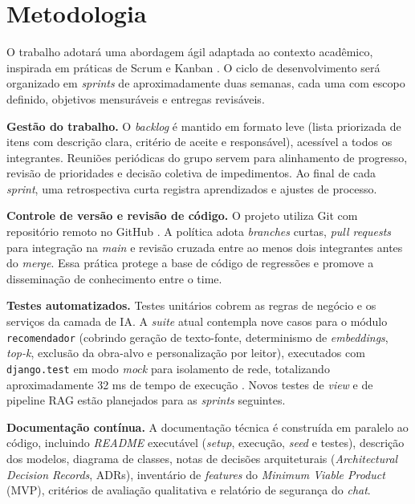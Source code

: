 \documentclass[monografia,abnt]{inf-ufg-modificado}
\begin{document}
\chapter{Metodologia}

O trabalho adotará uma abordagem ágil adaptada ao contexto acadêmico, inspirada em práticas de Scrum e Kanban \cite{scrum,kanban}. O ciclo de desenvolvimento será organizado em \textit{sprints} de aproximadamente duas semanas, cada uma com escopo definido, objetivos mensuráveis e entregas revisáveis.

\noindent\textbf{Gestão do trabalho.} O \textit{backlog} é mantido em formato leve (lista priorizada de itens com descrição clara, critério de aceite e responsável), acessível a todos os integrantes. Reuniões periódicas do grupo servem para alinhamento de progresso, revisão de prioridades e decisão coletiva de impedimentos. Ao final de cada \textit{sprint}, uma retrospectiva curta registra aprendizados e ajustes de processo.

\noindent\textbf{Controle de versão e revisão de código.} O projeto utiliza Git com repositório remoto no GitHub \cite{progit}. A política adota \textit{branches} curtas, \textit{pull requests} para integração na \textit{main} e revisão cruzada entre ao menos dois integrantes antes do \textit{merge}. Essa prática protege a base de código de regressões e promove a disseminação de conhecimento entre o time.

\noindent\textbf{Testes automatizados.} Testes unitários cobrem as regras de negócio e os serviços da camada de IA. A \textit{suite} atual contempla nove casos para o módulo \texttt{recomendador} (cobrindo geração de texto-fonte, determinismo de \textit{embeddings}, \textit{top-k}, exclusão da obra-alvo e personalização por leitor), executados com \texttt{django.test} em modo \textit{mock} para isolamento de rede, totalizando aproximadamente 32 ms de tempo de execução \cite{xunit}. Novos testes de \textit{view} e de pipeline RAG estão planejados para as \textit{sprints} seguintes.

\noindent\textbf{Documentação contínua.} A documentação técnica é construída em paralelo ao código, incluindo \textit{README} executável (\textit{setup}, execução, \textit{seed} e testes), descrição dos modelos, diagrama de classes, notas de decisões arquiteturais (\textit{Architectural Decision Records}, ADRs), inventário de \textit{features} do \textit{Minimum Viable Product} (MVP), critérios de avaliação qualitativa e relatório de segurança do \textit{chat}.
\end{document}
